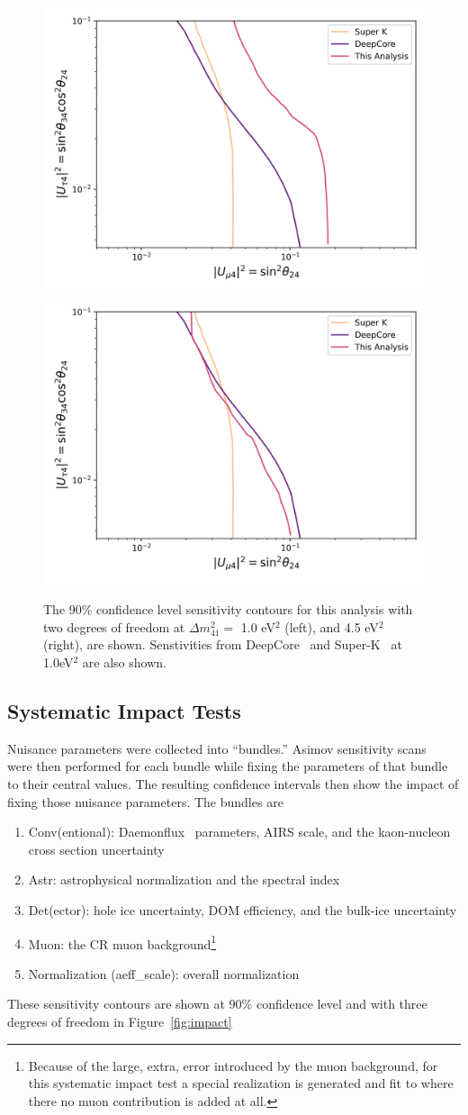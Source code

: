 \documentclass[main.tex]{subfiles}
\begin{document}
\begin{figure}
    \centering
    \includegraphics[width=0.45\linewidth]{figures/comparison.png}%
    \includegraphics[width=0.45\linewidth]{figures/comparison_45.png}%
    \caption{The 90\% confidence level sensitivity contours for this analysis with two degrees of freedom at $\Delta m_{41}^{2}=$ 1.0 eV$^{2}$ (left), and  4.5 eV$^{2}$ (right), are shown. Senstivities from DeepCore~\cite{Aartsen_2017_dc} and Super-K~\cite{PhysRevD.91.052019} at 1.0eV$^{2}$ are also shown.}\label{fig:asimov_compare}
\end{figure}



\subsection{Systematic Impact Tests}

Nuisance parameters were collected into ``bundles.'' 
Asimov sensitivity scans~\cite{Cowan_2011} were then performed for each bundle while fixing the parameters of that bundle to their central values.
The resulting confidence intervals then show the impact of fixing those nuisance parameters. 
The bundles are 
\begin{enumerate}
    \item Conv(entional): Daemonflux~\cite{yanez2023daemonflux} parameters, AIRS scale, and the kaon-nucleon cross section uncertainty
    \item Astr: astrophysical normalization and the spectral index
    \item Det(ector): hole ice uncertainty, DOM efficiency, and the bulk-ice uncertainty
    \item Muon: the CR muon background\footnote{Because of the large, extra, error introduced by the muon background, for this systematic impact test a special realization is generated and fit to where there no muon contribution is added at all.}
    \item Normalization (aeff\_scale): overall normalization
\end{enumerate}
These sensitivity contours are shown at 90\% confidence level and with three degrees of freedom in Figure~\ref{fig:impact}
\end{document}
